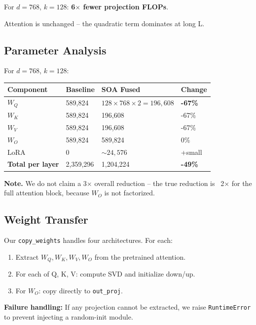 For $d = 768$, $k = 128$: \textbf{6$\times$ fewer projection FLOPs}.

Attention is unchanged -- the quadratic term dominates at long L.

\subsection{Parameter Analysis}

For $d = 768$, $k = 128$:

\begin{table}[H]
\centering
\small
\begin{tabular}{llll}
\toprule
\textbf{Component} & \textbf{Baseline} & \textbf{SOA Fused} & \textbf{Change} \\
\midrule
$W_Q$ & 589,824 & $128 \times 768 \times 2 = 196,608$ & \textbf{-67\%} \\
$W_K$ & 589,824 & 196,608 & -67\% \\
$W_V$ & 589,824 & 196,608 & -67\% \\
$W_O$ & 589,824 & 589,824 & 0\% \\
LoRA & 0 & $\sim 24,576$ & +small \\
\textbf{Total per layer} & 2,359,296 & 1,204,224 & \textbf{-49\%} \\
\bottomrule
\end{tabular}
\end{table}

\textbf{Note.} We do not claim a 3$\times$ overall reduction -- the true reduction is ~2$\times$ 
for the full attention block, because $W_O$ is not factorized.

\subsection{Weight Transfer}

Our \texttt{copy\_weights} handles four architectures. For each:

\begin{enumerate}
\item Extract $W_Q, W_K, W_V, W_O$ from the pretrained attention.
\item For each of Q, K, V: compute SVD and initialize down/up.
\item For $W_O$: copy directly to \texttt{out\_proj}.

\end{enumerate}
\textbf{Failure handling:} If any projection cannot be extracted, we raise 
\texttt{RuntimeError} to prevent injecting a random-init module.

